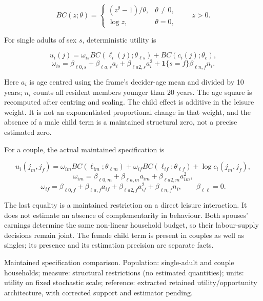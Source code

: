 \documentclass[11pt,a4paper]{article}
\begin{document}
\[BC(z;\theta)=\begin{cases}(z^\theta-1)/\theta,&\theta\ne0,\\\log z,&\theta=0,\end{cases}\qquad z>0.\]

For single adults of sex \(s\), deterministic utility is

\[u_i(j)=\omega_{is}BC(\ell_i(j);\theta_{\ell s})+BC(c_i(j);\theta_c),\] \[\omega_{is}=\beta_{\ell0,s}+\beta_{\ell a,s}a_i+\beta_{\ell a2,s}a_i^2+
\mathbf1\{s=f\}\beta_{\ell n,f}n_i.\]

Here \(a_i\) is age centred using the frame's decider-age mean and divided by 10 years; \(n_i\) counts all resident members younger than 20 years. The age square is recomputed after centring and scaling. The child effect is additive in the leisure weight. It is not an exponentiated proportional change in that weight, and the absence of a male child term is a maintained structural zero, not a precise estimated zero.

For a couple, the actual maintained specification is

\[u_i(j_m,j_f)=\omega_{im}BC(\ell_{im};\theta_{\ell m})+
\omega_{if}BC(\ell_{if};\theta_{\ell f})+\log c_i(j_m,j_f),\] \[\omega_{im}=\beta_{\ell0,m}+\beta_{\ell a,m}a_{im}+\beta_{\ell a2,m}a_{im}^2,\] \[\omega_{if}=\beta_{\ell0,f}+\beta_{\ell a,f}a_{if}+\beta_{\ell a2,f}a_{if}^2+
\beta_{\ell n,f}n_i,\qquad \beta_{\ell\ell}=0.\]

The last equality is a maintained restriction on a direct leisure interaction. It does not estimate an absence of complementarity in behaviour. Both spouses' earnings determine the same non-linear household budget, so their labour-supply decisions remain joint. The female child term is present in couples as well as singles; its presence and its estimation precision are separate facts.

Maintained specification comparison. Population: single-adult and couple households; measure: structural restrictions (no estimated quantities); units: utility on fixed stochastic scale; reference: extracted retained utility/opportunity architecture, with corrected support and estimator pending.
\end{document}

